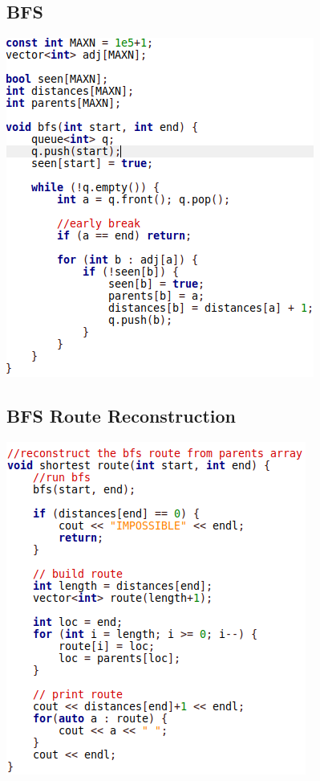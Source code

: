 \documentclass[11pt,twocolumn]{article}
\begin{document}
\subsection{BFS}
\includegraphics[scale=0.5]{bfs}
\subsection{BFS Route Reconstruction}
\includegraphics[scale=0.5]{bfsroutes}
\end{document}
